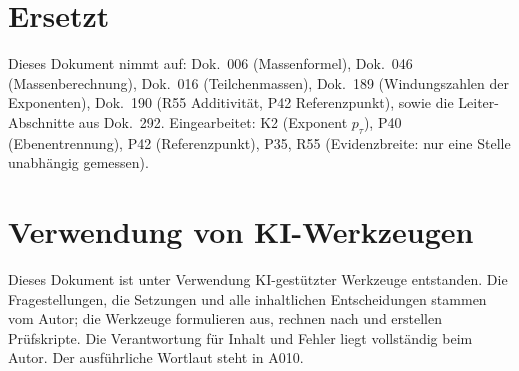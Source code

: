 \section{Ersetzt}

Dieses Dokument nimmt auf: Dok.~006 (Massenformel), Dok.~046 (Massenberechnung),
Dok.~016 (Teilchenmassen), Dok.~189 (Windungszahlen der Exponenten), Dok.~190
(R55 Additivität, P42 Referenzpunkt), sowie die Leiter-Abschnitte aus Dok.~292.
Eingearbeitet: K2 (Exponent $p_\tau$), P40 (Ebenentrennung), P42 (Referenzpunkt),
P35, R55 (Evidenzbreite: nur eine Stelle unabhängig gemessen).

\section{Verwendung von KI-Werkzeugen}

Dieses Dokument ist unter Verwendung KI-gestützter Werkzeuge entstanden. Die
Fragestellungen, die Setzungen und alle inhaltlichen Entscheidungen stammen vom
Autor; die Werkzeuge formulieren aus, rechnen nach und erstellen Prüfskripte.
Die Verantwortung für Inhalt und Fehler liegt vollständig beim Autor. Der
ausführliche Wortlaut steht in A010.
